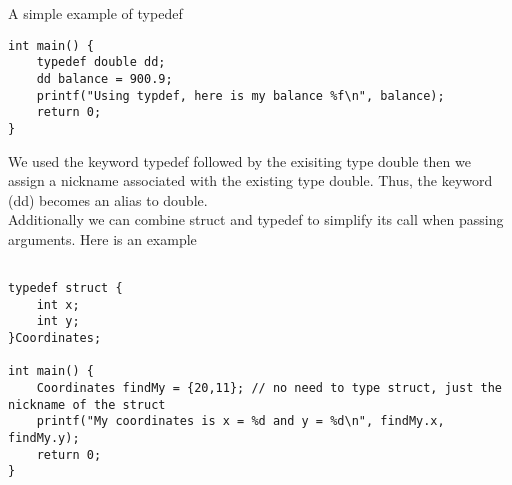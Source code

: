 \documentclass{article}
\begin{document}
\noindent A simple example of typedef

\begin{verbatim}
int main() {
	typedef double dd;
	dd balance = 900.9;
	printf("Using typdef, here is my balance %f\n", balance);
	return 0;
}
\end{verbatim}

We used the keyword typedef followed by the exisiting type double then we assign a nickname associated 
with the existing type double. Thus, the keyword (dd) becomes an alias to double. \\

\noindent Additionally we can combine struct and typedef to simplify its call when passing arguments. 
Here is an example

\begin{verbatim}

typedef struct {
	int x;
	int y;
}Coordinates;

int main() {
	Coordinates findMy = {20,11}; // no need to type struct, just the nickname of the struct
	printf("My coordinates is x = %d and y = %d\n", findMy.x, findMy.y);
	return 0;
}
\end{verbatim}
\end{document}

